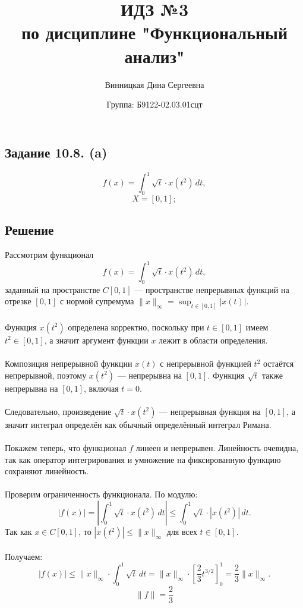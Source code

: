 \documentclass{article}
\title{\vspace{-1cm}ИДЗ №3 \\ по дисциплине "Функциональный анализ"}
\author{Винницкая Дина Сергеевна}
\date{Группа: Б9122-02.03.01сцт}
\begin{document}
	
	\maketitle

\subsection{Задание 10.8. (a)}
$$f(x) = \int_0^1 \sqrt{t} \cdot x(t^2)\, dt,$$
 $$X = \left[ 0,1 \right];$$


\subsection{Решение}

Рассмотрим функционал
\[
f(x) = \int_0^1 \sqrt{t} \cdot x(t^2)\, dt,
\]
заданный на пространстве $C[0,1]$ — пространстве непрерывных функций на отрезке $[0,1]$ с нормой супремума $\|x\|_\infty = \sup_{t \in [0,1]} |x(t)|$.\\\\
Функция $x(t^2)$ определена корректно, поскольку при $t \in [0,1]$ имеем $t^2 \in [0,1]$, а значит аргумент функции $x$ лежит в области определения.\\ \\
Композиция непрерывной функции $x(t)$ с непрерывной функцией $t^2$ остаётся непрерывной, поэтому $x(t^2)$ — непрерывна на $[0,1]$. Функция $\sqrt{t}$ также непрерывна на $[0,1]$, включая $t = 0$.\\ \\ Следовательно, произведение $\sqrt{t} \cdot x(t^2)$ — непрерывная функция на $[0,1]$, а значит интеграл определён как обычный определённый интеграл Римана.\\ \\
Покажем теперь, что функционал $f$ линеен и непрерывен. Линейность очевидна, так как оператор интегрирования и умножение на фиксированную функцию сохраняют линейность.\\ \\ Проверим ограниченность функционала. По модулю:
\[
|f(x)| = \left| \int_0^1 \sqrt{t} \cdot x(t^2) \, dt \right| \leq \int_0^1 \sqrt{t} \cdot |x(t^2)| \, dt.
\]
Так как $x \in C[0,1]$, то $|x(t^2)| \leq \|x\|_\infty$ для всех $t \in [0,1]$. \\ \\ Получаем:
\[
|f(x)| \leq \|x\|_\infty \cdot \int_0^1 \sqrt{t} \, dt = \|x\|_\infty \cdot \left[\frac{2}{3}t^{3/2}\right]_0^1 = \frac{2}{3} \|x\|_\infty.
\]
\[
\|f\| = \frac{2}{3}
\]
\end{document}
